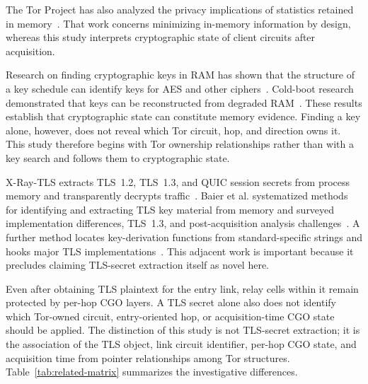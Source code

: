 \documentclass[10pt,a4paper]{article}
\begin{document}
The Tor Project has also analyzed the privacy implications of statistics retained in memory~\cite{tor2017memory}.
That work concerns minimizing in-memory information by design, whereas this study interprets cryptographic state of client circuits after acquisition.


Research on finding cryptographic keys in RAM has shown that the structure of a key schedule can identify keys for AES and other ciphers~\cite{maartmannmoe2009persistence}.
Cold-boot research demonstrated that keys can be reconstructed from degraded RAM~\cite{halderman2008coldboot}.
These results establish that cryptographic state can constitute memory evidence.
Finding a key alone, however, does not reveal which Tor circuit, hop, and direction owns it.
This study therefore begins with Tor ownership relationships rather than with a key search and follows them to cryptographic state.


X-Ray-TLS extracts TLS~1.2, TLS~1.3, and QUIC session secrets from process memory and transparently decrypts traffic~\cite{moriconi2024xraytls}. Baier et al. systematized methods for identifying and extracting TLS key material from memory and surveyed implementation differences, TLS~1.3, and post-acquisition analysis challenges~\cite{baier2024tlsmemory}. A further method locates key-derivation functions from standard-specific strings and hooks major TLS implementations~\cite{baier2025allyourtlskeys}. This adjacent work is important because it precludes claiming TLS-secret extraction itself as novel here.

Even after obtaining TLS plaintext for the entry link, relay cells within it remain protected by per-hop CGO layers. A TLS secret alone also does not identify which Tor-owned circuit, entry-oriented hop, or acquisition-time CGO state should be applied. The distinction of this study is not TLS-secret extraction; it is the association of the TLS object, link circuit identifier, per-hop CGO state, and acquisition time from pointer relationships among Tor structures. Table~\ref{tab:related-matrix} summarizes the investigative differences.
\end{document}
